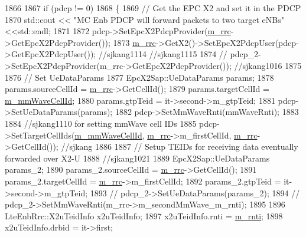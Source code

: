 \begin{DoxyCode}
1866 
1867         \textcolor{keywordflow}{if} (pdcp != 0)
1868         \{
1869           \textcolor{comment}{// Get the EPC X2 and set it in the PDCP}
1870                  std::cout << \textcolor{stringliteral}{"MC Enb PDCP will forward packets to two target eNBs"} <<std::endl;
1871 
1872           pdcp->SetEpcX2PdcpProvider(\hyperlink{classns3_1_1UeManager_ab4405e9f354c66e7c1a4c95832290f5b}{m\_rrc}->GetEpcX2PdcpProvider());
1873           \hyperlink{classns3_1_1UeManager_ab4405e9f354c66e7c1a4c95832290f5b}{m\_rrc}->GetX2()->SetEpcX2PdcpUser(pdcp->GetEpcX2PdcpUser()); \textcolor{comment}{//sjkang1114 //sjkang1115}
1874        \textcolor{comment}{//   pdcp\_2->SetEpcX2PdcpProvider(m\_rrc->GetEpcX2PdcpProvider()); //sjkang1016}
1875 
1876           \textcolor{comment}{// Set UeDataParams}
1877           EpcX2Sap::UeDataParams params;
1878           params.sourceCellId = \hyperlink{classns3_1_1UeManager_ab4405e9f354c66e7c1a4c95832290f5b}{m\_rrc}->GetCellId();
1879           params.targetCellId = \hyperlink{classns3_1_1UeManager_a0f53cb816bd8a3ad6227dc9adca671b2}{m\_mmWaveCellId};
1880           params.gtpTeid = it->second->m\_gtpTeid;
1881           pdcp->SetUeDataParams(params);
1882           pdcp->SetMmWaveRnti(mmWaveRnti);
1883 
1884           \textcolor{comment}{//sjkang1110 for setting mmWave cell IDs}
1885           pdcp->SetTargetCellIds(\hyperlink{classns3_1_1UeManager_a0f53cb816bd8a3ad6227dc9adca671b2}{m\_mmWaveCellId}, \hyperlink{classns3_1_1UeManager_ab4405e9f354c66e7c1a4c95832290f5b}{m\_rrc}->m\_firstCellId, 
      \hyperlink{classns3_1_1UeManager_ab4405e9f354c66e7c1a4c95832290f5b}{m\_rrc}->GetCellId()); \textcolor{comment}{//sjkang}
1886 
1887           \textcolor{comment}{// Setup TEIDs for receiving data eventually forwarded over X2-U}
1888           \textcolor{comment}{//sjkang1021}
1889           EpcX2Sap::UeDataParams params\_2;
1890              params\_2.sourceCellId = \hyperlink{classns3_1_1UeManager_ab4405e9f354c66e7c1a4c95832290f5b}{m\_rrc}->GetCellId();
1891              params\_2.targetCellId = \hyperlink{classns3_1_1UeManager_ab4405e9f354c66e7c1a4c95832290f5b}{m\_rrc}->m\_firstCellId;
1892              params\_2.gtpTeid = it->second->m\_gtpTeid;
1893          \textcolor{comment}{//    pdcp\_2->SetUeDataParams(params\_2);}
1894           \textcolor{comment}{//   pdcp\_2->SetMmWaveRnti(m\_rrc->m\_secondMmWave\_m\_rnti);}
1895 
1896           LteEnbRrc::X2uTeidInfo x2uTeidInfo;
1897           x2uTeidInfo.rnti = \hyperlink{classns3_1_1UeManager_a5a72b4fe818f21993bd7f05d7e2c4f83}{m\_rnti};
1898           x2uTeidInfo.drbid = it->first;

\end{DoxyCode}
